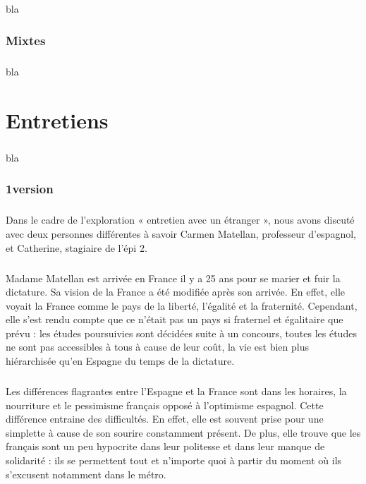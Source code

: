 \paragraph{}
bla

\subsection{Mixtes}
\paragraph{}
bla

\chapter{Entretiens}
\paragraph{}
bla

\subsection{1\ier version}
\paragraph{}
Dans le cadre de l’exploration « entretien avec un étranger », nous avons discuté avec deux personnes différentes à savoir Carmen Matellan, professeur d’espagnol, et Catherine, stagiaire de l’épi 2.
\paragraph{}
Madame Matellan est arrivée en France il y a 25 ans pour se marier et fuir la dictature. Sa vision de la France a été modifiée après son arrivée. En effet, elle voyait la France comme le pays de la liberté, l’égalité et la fraternité. Cependant, elle s’est rendu compte que ce n’était pas un pays si fraternel et égalitaire que prévu : les études poursuivies sont décidées suite à un concours, toutes les études ne sont pas accessibles à tous à cause de leur coût, la vie est bien plus hiérarchisée qu’en Espagne du temps de la dictature. 
\paragraph{}
Les différences flagrantes entre l’Espagne et la France sont dans les horaires, la nourriture et le pessimisme français opposé à l’optimisme espagnol. Cette différence entraine des difficultés. En effet, elle est souvent prise pour une simplette à cause de son sourire constamment présent. De plus, elle trouve que les français sont un peu hypocrite dans leur politesse et dans leur manque de solidarité : ils se permettent tout et n’importe quoi à partir du moment où ils s’excusent notamment dans le métro.
